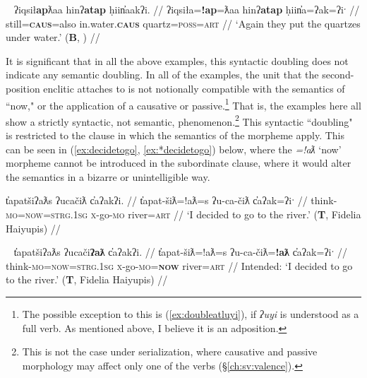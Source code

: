 
\begin{comment}
\ex~ \label{ex:doubleatgeneric}
\begingl
\glpreamble ʔayaqḥʔatna huḥtak̓at. //
\gla ʔaya-(q)ḥ=!at=naˑ huḥtak=!at  //
\glb many-\textsc{link}=\textsc{pass}=\textsc{neut.1pl} learn=\textsc{pass} //
\glft `Many know.' (\textbf{B}, Sarah Webster) //
\endgl
\xe
\end{comment}


\ex~ \label{ex:doubleap}
\begingl
\glpreamble ʔiqsił\textbf{ap}ƛaa hinʔ\textbf{atap} ḥiin̓aakʔi.\footnotemark{} //
\gla ʔiqsiła=\textbf{!ap}=ƛaa hinʔ\textbf{atap} ḥiin̓a=ʔak=ʔiˑ  //
\glb still=\textbf{\textsc{caus}}=also in.water.\textbf{\textsc{caus}} quartz=\textsc{poss}=\textsc{art} //
\glft `Again they put the quartzes under water.' (\textbf{B}, \citet[p.~60]{sapir1955}) //
\endgl
\xe


It is significant that in all the above examples, this syntactic doubling does not indicate any semantic doubling. In all of the examples, the unit that the second-position enclitic attaches to is not notionally compatible with the semantics of ``now," or the application of a causative or passive.\footnote{The possible exception to this is (\ref{ex:doubleatluyi}), if \textit{ʔuyi} is understood as a full verb. As mentioned above, I believe it is an adposition.} That is, the examples here all show a strictly syntactic, not semantic, phenomenon.\footnote{This is not the case under serialization, where causative and passive morphology may affect only one of the verbs (\S\ref{ch:sv:valence}).} This syntactic ``doubling" is restricted to the clause in which the semantics of the morpheme apply. This can be seen in (\ref{ex:decidetogo}, \ref{ex:*decidetogo}) below, where the \textit{=!aƛ} `now' morpheme cannot be introduced in the subordinate clause, where it would alter the semantics in a bizarre or unintelligible way.

\ex \label{ex:decidetogo}
\begingl
\glpreamble t̓apatšiʔaƛs ʔucačiƛ c̓aʔakʔi. //
\gla t̓apat-šiƛ=!aƛ=s ʔu-ca-čiƛ c̓aʔak=ʔiˑ //
\glb think-\textsc{mo}=\textsc{now}=\textsc{strg.1sg} \textsc{x}-go-\textsc{mo} river=\textsc{art} //
\glft `I decided to go to the river.' (\textbf{T}, Fidelia Haiyupis) //
\endgl
\xe

\ex~ \label{ex:*decidetogo}
\begingl
\glpreamble *t̓apatšiʔaƛs ʔucači\textbf{ʔaƛ} c̓aʔakʔi. //
\gla *t̓apat-šiƛ=!aƛ=s ʔu-ca-čiƛ=\textbf{!aƛ} c̓aʔak=ʔiˑ //
\glb think-\textsc{mo}=\textsc{now}=\textsc{strg.1sg} \textsc{x}-go-\textsc{mo}=\textbf{\textsc{now}} river=\textsc{art} //
\glft Intended: `I decided to go to the river.' (\textbf{T}, Fidelia Haiyupis) //
\endgl
\xe

